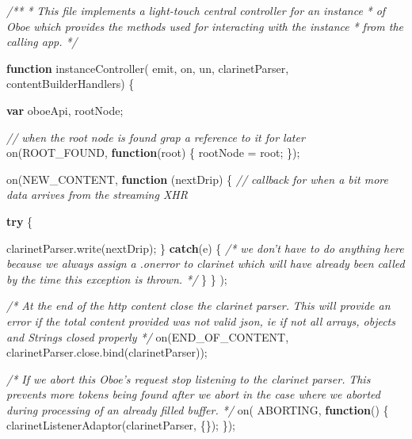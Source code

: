 \documentclass[]{article}
\newenvironment{Shaded}{}{}
\newcommand{\KeywordTok}[1]{\textcolor[rgb]{0.00,0.44,0.13}{\textbf{{#1}}}}
\newcommand{\CommentTok}[1]{\textcolor[rgb]{0.38,0.63,0.69}{\textit{{#1}}}}
\newcommand{\OtherTok}[1]{\textcolor[rgb]{0.00,0.44,0.13}{{#1}}}
\newcommand{\FunctionTok}[1]{\textcolor[rgb]{0.02,0.16,0.49}{{#1}}}
\newcommand{\NormalTok}[1]{{#1}}
\begin{document}
\begin{Shaded}
\begin{Highlighting}[]
\CommentTok{/**}
\CommentTok{ * This file implements a light-touch central controller for an instance }
\CommentTok{ * of Oboe which provides the methods used for interacting with the instance }
\CommentTok{ * from the calling app.}
\CommentTok{ */}
 
 
\KeywordTok{function} \FunctionTok{instanceController}\NormalTok{(  emit, on, un, }
                              \NormalTok{clarinetParser, contentBuilderHandlers) \{}
  
   \KeywordTok{var} \NormalTok{oboeApi, rootNode;}

   \CommentTok{// when the root node is found grap a reference to it for later      }
   \FunctionTok{on}\NormalTok{(ROOT_FOUND, }\KeywordTok{function}\NormalTok{(root) \{}
      \NormalTok{rootNode = root;   }
   \NormalTok{\});}
                              
   \FunctionTok{on}\NormalTok{(NEW_CONTENT,         }
      \KeywordTok{function} \NormalTok{(nextDrip) \{}
         \CommentTok{// callback for when a bit more data arrives from the streaming XHR         }
          
         \KeywordTok{try} \NormalTok{\{}
            
            \OtherTok{clarinetParser}\NormalTok{.}\FunctionTok{write}\NormalTok{(nextDrip);            }
         \NormalTok{\} }\KeywordTok{catch}\NormalTok{(e) \{ }
            \CommentTok{/* we don't have to do anything here because we always assign}
\CommentTok{               a .onerror to clarinet which will have already been called }
\CommentTok{               by the time this exception is thrown. */}                
         \NormalTok{\}}
      \NormalTok{\}}
   \NormalTok{);}
   
   \CommentTok{/* At the end of the http content close the clarinet parser.}
\CommentTok{      This will provide an error if the total content provided was not }
\CommentTok{      valid json, ie if not all arrays, objects and Strings closed properly */}
   \FunctionTok{on}\NormalTok{(END_OF_CONTENT, }\OtherTok{clarinetParser}\NormalTok{.}\OtherTok{close}\NormalTok{.}\FunctionTok{bind}\NormalTok{(clarinetParser));}
   

   \CommentTok{/* If we abort this Oboe's request stop listening to the clarinet parser. }
\CommentTok{      This prevents more tokens being found after we abort in the case where }
\CommentTok{      we aborted during processing of an already filled buffer. */}
   \FunctionTok{on}\NormalTok{( ABORTING, }\KeywordTok{function}\NormalTok{() \{}
      \FunctionTok{clarinetListenerAdaptor}\NormalTok{(clarinetParser, \{\});}
   \NormalTok{\});   }


\end{Highlighting}
\end{Shaded}
\end{document}
